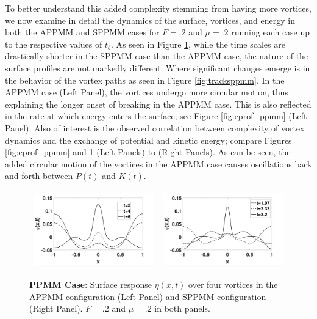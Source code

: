 \documentclass[a4paper,11pt]{article}
\begin{document}
To better understand this added complexity stemming from having more vortices, we now examine in detail the dynamics of the surface, vortices, and energy in both the APPMM and SPPMM cases for $F=.2$ and $\mu=.2$ running each case up to the respective values of $t_{b}$.  As seen in Figure \ref{fig:surfrepppmm}, while the time scales are drastically shorter in the SPPMM case than the APPMM case, the nature of the surface profiles are not markedly different.  Where significant changes emerge is in the behavior of the vortex paths as seen in Figure \ref{fig:tracksppmm}.  In the APPMM case (Left Panel), the vortices undergo more circular motion, thus explaining the longer onset of breaking in the APPMM case.  This is also reflected in the rate at which energy enters the surface; see Figure \ref{fig:eprof_ppmm} (Left Panel).   Also of interest is the observed correlation between complexity of vortex dynamics and the exchange of potential and kinetic energy; compare Figures \ref{fig:eprof_ppmm} and \ref{fig:surfrepppmm} (Left Panels) to (Right Panels).  As can be seen, the added circular motion of the vortices in the APPMM case causes oscillations back and forth between $P(t)$ and $K(t)$.
%
\begin{figure}[!h]
\centering
\begin{tabular}{cc}
\includegraphics[width=.5\textwidth]{surf_resp_mu_pt2_F_pt2_ppmm} & 
\includegraphics[width=.5\textwidth]{surf_resp_mu_pt2_F_pt2_ppmm_sym}
\end{tabular}
\caption{\small {\bf PPMM Case}: Surface response $\eta(x,t)$ over four vortices in the APPMM configuration (Left Panel) and SPPMM configuration (Right Panel).  $F=.2$ and $\mu=.2$ in both panels.}
\label{fig:surfrepppmm}
\end{figure}
\end{document}
